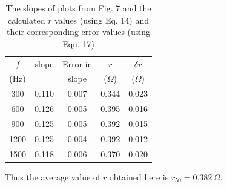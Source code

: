 \begin{table}[H]
    \centering
    \begin{tabular}{|c|c|c|c|c|} \hline
        $f$ & slope & Error in  & $r$ & $\delta r$ \\
        (Hz) & & slope & ($\Omega$) & ($\Omega$) \\\hline
        300 & 0.110 & 0.007 & 0.344 &        0.023 \\
        600 & 0.126 & 0.005 & 0.395 &        0.016 \\
        900 & 0.125 & 0.005 & 0.392 &        0.015 \\
        1200 & 0.125 & 0.004 & 0.392 &        0.012 \\
        1500 & 0.118 & 0.006 & 0.370 &        0.020 \\\hline
    \end{tabular}
    \caption{The slopes of plots from Fig. 7 and the calculated $r$ values (using Eq. 14) and their corresponding error values (using Eqn. 17)}
\end{table}

Thus the average value of $r$ obtained here is $r_{50}=0.382\,\Omega$.




